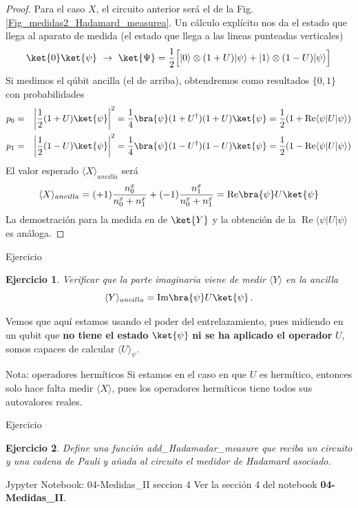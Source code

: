 \documentclass[a4paper,11pt]{book} %
\newtheorem{ejercicio_contador}{Ejercicio}
\newcommand{\Ejercicio}[1]{
		\begin{mybox_gray}{Ejercicio} 
			\begin{ejercicio_contador}
				 #1 
			\end{ejercicio_contador} 
		\end{mybox_gray}
	}
\numberwithin{equation}{chapter}
\def\Lc{\Bigl[}
\def\Rc{\Bigr]}
\begin{document}
	\begin{proof}
	 Para el caso $X$, el circuito anterior será el de la Fig. \ref{Fig_medidas2_Hadamard_measurea}. Un cálculo explícito nos da el estado que llega al aparato de medida (el estado que llega a las lineas punteadas verticales)
	$$
	\ket{0}\ket{\psi} ~\to ~ \ket{\Psi} = \frac{1}{2} \Lc \rule{0mm}{3mm} |0\rangle \otimes (1 + U) |\psi\rangle +  |1\rangle \otimes (1 - U) |\psi\rangle \Rc \label{hadam}
	$$
Si medimos el qúbit ancilla (el de arriba), obtendremos como resultados $\{0,1\}$ con probabilidades 
\begin{eqnarray} 
 p_{0}  &=&  \left\vert \frac{1}{2}  (1 + U) \ket{\psi}  \right\vert^{2} = 
 \frac{1}{4}\bra{\psi}(1 + U^\dagger) (1 + U) \ket{\psi} =\frac{1}{2}(1+\operatorname{Re}\langle \psi|U|\psi\rangle) \nonumber\\
 p_{1}  &=&  \left\vert \frac{1}{2}  (1 - U) \ket{\psi}  \right\vert^{2}=
 \frac{1}{4}\bra{\psi}(1 - U^\dagger) (1 - U) \ket{\psi} =
 \frac{1}{2}(1-\operatorname{Re}\langle \psi|U|\psi\rangle) \nonumber
\end{eqnarray}
El valor esperado $\langle X \rangle_{ancilla}$ será
	$$
	\langle X \rangle_{ancilla} = (+1) \frac{n^x_0}{n_0^x+n_1^x} + (-1) \frac{n^x_1}{n^x_0+n^x_1} =  \hbox{Re}\bra{\psi} U \ket{\psi}
	$$
La demostración para la medida en de $\ket{Y}$ y la obtención de la $\operatorname{Re}\langle \psi|U|\psi\rangle$ es análoga.
	\end{proof}

	\Ejercicio{
	Verificar que la parte imaginaria viene de medir  $\langle Y\rangle$ en la ancilla
	$$
	\langle{Y}\rangle_{ancilla}  =  \hbox{Im}\bra{\psi} U \ket{\psi} \, .
	$$
	}

Vemos que aquí estamos usando el poder del entrelazamiento, pues midiendo en un qubit que\textbf{ no tiene el estado} $\ket{\psi}$ \textbf{ni se ha aplicado el operador} $U$, somos capaces de calcular $\langle U \rangle_\psi$. 

	\begin{mybox_blue}{Nota: operadores hermíticos}
	Si estamos en el caso en que $U$ es hermítico, entonces solo hace falta medir $\langle X \rangle$, pues 
	los operadores hermíticos tiene todos sus autovalores reales.
	\end{mybox_blue}

	\Ejercicio{
	Define una función add\_Hadamadar\_measure que reciba un circuito y una  cadena de Pauli y añada al 
	circuito el medidor de Hadamard asociado.
	}
	
	\begin{mybox_orange}{Jypyter Notebook: 04-Medidas\_II seccion 4}
	Ver la sección 4 del notebook \textbf{04-Medidas\_II}.
	\end{mybox_orange}
\end{document}
